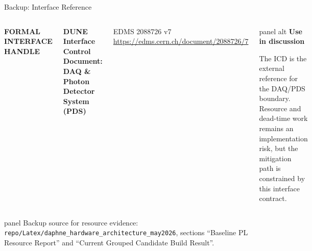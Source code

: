 \documentclass[aspectratio=169,10pt]{beamer}
\newcommand{\eyebrow}[1]{{\color{noircyan}\small\bfseries #1\par}}
\begin{document}
\newcommand{\backupresourcebar}[4]{%
  \begin{tikzpicture}[x=0.1cm,y=0.34cm,baseline=(label.base)]
    \pgfmathsetmacro{\barend}{#2/10}
    \node[anchor=east,font=\scriptsize,text=noirmuted] (label) at (0,0) {#1};
    \draw[draw=noirline,fill=noirpanelalt,rounded corners=1pt] (0.25,-0.17) rectangle (10.25,0.17);
    \draw[draw=#4,fill=#4!30,rounded corners=1pt] (0.25,-0.17) rectangle ({0.25+\barend},0.17);
    \node[anchor=west,font=\scriptsize,text=noirtext] at (10.45,0) {#3};
  \end{tikzpicture}\par
}

\begin{frame}[noframenumbering,t]{Backup: Interface Reference}
\begin{columns}[T,onlytextwidth]
\eyebrow{FORMAL INTERFACE HANDLE}
{\color{white}\bfseries DUNE Interface Control Document: DAQ \& Photon Detector System (PDS)\par}
\vspace{1mm}
{\color{noirmuted}\small
EDMS 2088726 v7\\
\href{https://edms.cern.ch/document/2088726/7}{https://edms.cern.ch/document/2088726/7}\par}

\begin{beamercolorbox}[wd=\linewidth,sep=6pt,rounded=true]{panel alt}
\footnotesize
\textcolor{noircyan}{\textbf{Use in discussion}}\par
\vspace{0.5mm}
The ICD is the external reference for the DAQ/PDS boundary. Resource and dead-time work remains an implementation risk, but the mitigation path is constrained by this interface contract.
\end{beamercolorbox}
\end{columns}

\vspace{2mm}
\begin{beamercolorbox}[wd=\linewidth,sep=5pt,rounded=true]{panel}
\scriptsize
Backup source for resource evidence: \texttt{repo/Latex/daphne\_hardware\_architecture\_may2026}, sections ``Baseline PL Resource Report'' and ``Current Grouped Candidate Build Result''.
\end{beamercolorbox}
\end{frame}
\end{document}
